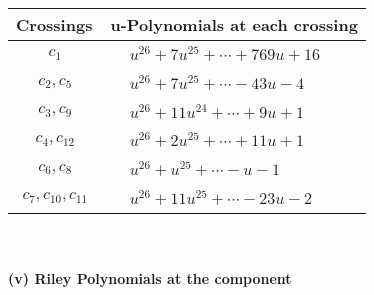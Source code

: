 \documentclass[1p]{elsarticle_modified}
\theoremstyle{definition}
\begin{document}
\begin{tabular}{m{50pt}|m{274pt}}
Crossings & \hspace{64pt}u-Polynomials at each crossing \\
\hline $$\begin{aligned}c_{1}\end{aligned}$$&$\begin{aligned}
&u^{26}+7 u^{25}+\cdots+769 u+16
\end{aligned}$\\
\hline $$\begin{aligned}c_{2},c_{5}\end{aligned}$$&$\begin{aligned}
&u^{26}+7 u^{25}+\cdots-43 u-4
\end{aligned}$\\
\hline $$\begin{aligned}c_{3},c_{9}\end{aligned}$$&$\begin{aligned}
&u^{26}+11 u^{24}+\cdots+9 u+1
\end{aligned}$\\
\hline $$\begin{aligned}c_{4},c_{12}\end{aligned}$$&$\begin{aligned}
&u^{26}+2 u^{25}+\cdots+11 u+1
\end{aligned}$\\
\hline $$\begin{aligned}c_{6},c_{8}\end{aligned}$$&$\begin{aligned}
&u^{26}+u^{25}+\cdots- u-1
\end{aligned}$\\
\hline $$\begin{aligned}c_{7},c_{10},c_{11}\end{aligned}$$&$\begin{aligned}
&u^{26}+11 u^{25}+\cdots-23 u-2
\end{aligned}$\\
\hline
\end{tabular}\\~\\
\newpage\renewcommand{\arraystretch}{1}
\flushleft \textbf{(v) Riley Polynomials at the component}\newline \\
\end{document}
